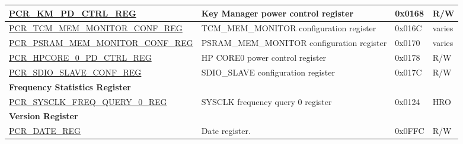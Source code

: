 \begin{longtable}{ | p{7cm} | p{6.2cm} | p{1.3cm} | p{1.5cm} | }
\hyperref[regdesc:PCRKMPDCTRLREG]{PCR\_KM\_PD\_CTRL\_REG} & Key Manager power control register & 0x0168 & R/W \\ \hline
\hyperref[regdesc:PCRTCMMEMMONITORCONFREG]{PCR\_TCM\_MEM\_MONITOR\_CONF\_REG} & TCM\_MEM\_MONITOR configuration register & 0x016C & varies \\ \hline
\hyperref[regdesc:PCRPSRAMMEMMONITORCONFREG]{PCR\_PSRAM\_MEM\_MONITOR\_CONF\_REG} & PSRAM\_MEM\_MONITOR configuration register & 0x0170 & varies \\ \hline
\hyperref[regdesc:PCRHPCORE0PDCTRLREG]{PCR\_HPCORE\_0\_PD\_CTRL\_REG} & HP CORE0 power control register & 0x0178 & R/W \\ \hline
\hyperref[regdesc:PCRSDIOSLAVECONFREG]{PCR\_SDIO\_SLAVE\_CONF\_REG} & SDIO\_SLAVE configuration register & 0x017C & R/W \\ \hline
\multicolumn{4}{|l|}{\textbf{Frequency Statistics Register}} \\ \hline
\hyperref[regdesc:PCRSYSCLKFREQQUERY0REG]{PCR\_SYSCLK\_FREQ\_QUERY\_0\_REG} & SYSCLK frequency query 0 register & 0x0124 & HRO \\ \hline
\multicolumn{4}{|l|}{\textbf{Version Register}} \\ \hline
\hyperref[regdesc:PCRDATEREG]{PCR\_DATE\_REG} & Date register. & 0x0FFC & R/W \\ \hline
\end{longtable}
